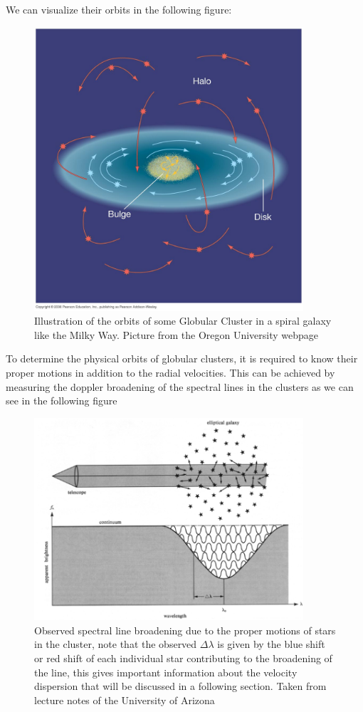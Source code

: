 We can visualize their orbits in the following figure:

\begin{figure}[H]
\centering
\includegraphics[width=10cm]{images/orbits_gcs.jpg}
\caption[Illustration of the orbits of Globular Clusters around a spiral galaxy]{Illustration of the orbits of some Globular Cluster in a spiral galaxy like the Milky Way. Picture from the Oregon University webpage}
\end{figure}

To determine the physical orbits of globular clusters, it is required to know their proper motions in addition to the radial velocities. This can be achieved by measuring the doppler broadening of the spectral lines in the clusters as we can see in the following figure

\begin{figure}[H]
\centering
\includegraphics[width=10cm]{images/4_gcs.png}
\caption[Spectral line broadening]{Observed spectral line broadening due to the proper motions of stars in the cluster, note that the observed $\Delta\lambda$ is given by the blue shift or red shift of each individual star contributing to the broadening of the line, this gives important information about the velocity dispersion that will be discussed in a following section. Taken from lecture notes of the University of Arizona}
\end{figure}

